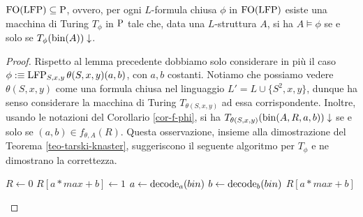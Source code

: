 \begin{proposizione}
\label{prop:FO(LFP)-subset-P}
 $\FO(\LFP) \subseteq \P$, ovvero, per ogni $L$-formula chiusa $\phi$ in $\FO(\LFP)$ esiste
 una macchina di Turing $T_\phi$ in $\P$ tale che, data una $L$-struttura $A$,
 si ha $A \models \phi$ se e solo se $T_\phi(\bin(A))\downarrow$.
\end{proposizione}
\begin{proof}
  Rispetto al lemma precedente dobbiamo solo considerare in più il caso
  $\phi :\equiv \LFP_{S,x,y}\theta(S,x,y)(a,b)$, con $a, b$ costanti.
  Notiamo che possiamo vedere
  $\theta(S,x,y)$ come una formula chiusa nel linguaggio $L'=L \cup \{S^2,x,y\}$,
  dunque ha senso considerare la macchina di Turing $T_{\theta(S,x,y)}$ ad essa
  corrispondente. Inoltre, usando le notazioni del Corollario \ref{cor-f-phi},
  si ha $T_{\theta(S,x,y)}(\bin(A,R,a,b))\downarrow$
  se e solo se $(a,b) \in f_{\theta,A}(R)$. Questa osservazione, insieme alla
  dimostrazione del Teorema \ref{teo-tarski-knaster}, suggeriscono il seguente
  algoritmo per $T_\phi$ e ne dimostrano la correttezza.
  
  \begin{algorithmic}
    \State $R\gets 0$
	\State $R[a*max + b] \gets 1$
      \EndIf
      \EndFor
    \EndFor
    \State $a \gets \decode_a (bin)$
    \State $b \gets \decode_b (bin)$
    \State \Return $R[a*max + b]$
  \EndFunction
  \end{algorithmic}
\end{proof}

